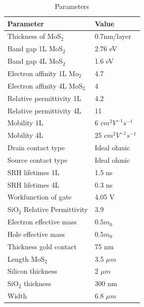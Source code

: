 \documentclass[12pt,a4paper,titlepage]{article}
\begin{document}
\begin{table}[H]
	\centering
	\begin{tabular}{l l}
		\toprule
		\textbf{Parameter}	       & \textbf{Value}			 \\
		\midrule
		Thickness of MoS$_2$       & 0.7nm/layer              \\
		Band gap 1L MoS$_2$        & 2.76 eV                  \\
		Band gap 4L MoS$_2$        & 1.6 eV                   \\
		Electron affinity 1L Mo$_2$& 4.7                      \\
		Electron affinity 4L MoS$_2$& 4                       \\
		Relative permittivity 1L   & 4.2                      \\
		Relative permittivity 4L   & 11                       \\
		Mobility 1L                & 6 $cm^2 V^{-1} s^{-1}$	  \\
		Mobility 4L                & 25 $cm^2 V^{-1} s^{-1}$  \\
		Drain contact type         & Ideal ohmic              \\
		Source contact type        & Ideal ohmic              \\
		SRH lifetimes 1L           & 1.5 ns                   \\
		SRH lifetimes 4L           & 0.3 ns                   \\
		Workfunction of gate       & 4.05 V                   \\
		SiO$_2$ Relative Permittivity & 3.9                   \\
		Electron effective mass    & $0.5 m_0$            	  \\
		Hole effective mass        & $0.5 m_0$           	  \\
		Thickness gold contact     & 75 nm                    \\
		Length MoS$_2$             & 3.5 $\mu m$              \\
		Silicon thickness          & 2 $\mu m$                \\
		SiO$_2$ thickness          & 300 nm	                  \\
		Width                      & 6.8 $\mu m$              \\
		\bottomrule
	\end{tabular}
	\caption{Parameters}
	\label{table:MoS2}
\end{table}
\end{document}
